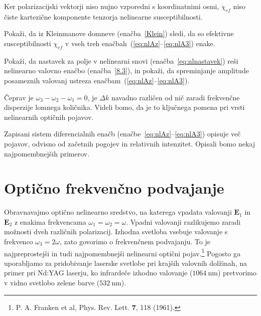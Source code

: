 Ker polarizacijski vektorji niso nujno vzporedni s koordinatnimi osmi, $\chi_{ef}$ 
niso čiste kartezične komponente tenzorja nelinearne susceptibilnosti.
\begin{definition}
Pokaži, da iz Kleinmanove domneve (enačba~\ref{Klein}) sledi, da so 
efektivne susceptibilnosti $\chi_{ef}$ v vseh treh enačbah~(\ref{eq:nlAz}--\ref{eq:nlA3}) enake.
\end{definition}
\begin{definition}
Pokaži, da nastavek za polje v nelinearni snovi (enačba~\ref{eq:nlnastavek}) reši nelinearno
valovno enačbo (enačba~\ref{8.3}), in pokaži, da spreminjanje amplitude posameznih valovanj 
ustreza enačbam~(\ref{eq:nlAz}--\ref{eq:nlA3}).
\end{definition}
Čeprav je $\omega_{3}-\omega_{2}-\omega_{1}=0$, je $\Delta k$ navadno različen od nič zaradi 
frekvenčne disperzije lomnega količnika. Videli bomo, da je to ključnega pomena 
pri vrsti nelinearnih optičnih pojavov. 

Zapisani sistem diferencialnih enačb (enačbe~\ref{eq:nlAz}--\ref{eq:nlA3}) opisuje več pojavov, 
odvisno od začetnih pogojev in relativnih intenzitet. Opisali bomo nekaj
najpomembnejših primerov.

\section{Optično frekvenčno podvajanje}
\label{chap:SHG}
Obravnavajmo optično nelinearno sredstvo, na katerega vpadata valovanji ${\mathbf E}_1$ in
$\mathbf{E}_2$ z enakima frekvencama $\omega_{1}=\omega_{2}=\omega$. Vpadni valovanji
razlikujemo zaradi možnosti dveh različnih polarizacij. Izhodna svetloba vsebuje valovanje
s frekvenco $\omega_{3}=2\omega$, zato govorimo o frekvenčnem 
podvajanju. To je
najpreprostejši in tudi najpomembnejši nelinearni optični pojav.\footnote{P. A. Franken et al, Phys. Rev. Lett.
$\mathbf{7}$, 118 (1961).} 
Pogosto ga uporabljamo za pridobivanje laserske svetlobe pri krajših valovnih dolžinah, na primer
pri Nd:YAG laserju, ko infrardeče izhodno valovanje ($1064~\si{\nano\metre}$) 
pretvorimo v vidno svetlobo zelene barve ($532~\si{\nano\metre}$). 

